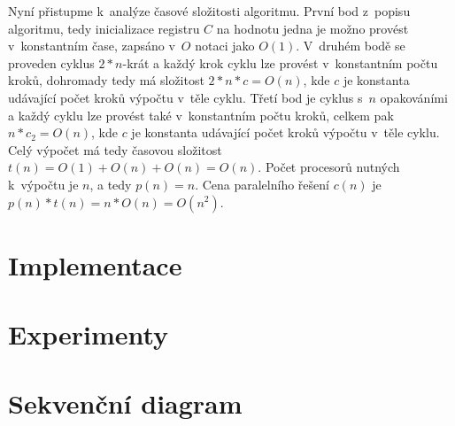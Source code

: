 \documentclass[a4paper, 12pt]{article}
\begin{document}
Nyní přistupme k~analýze časové složitosti algoritmu.
První bod z~popisu algoritmu, tedy inicializace registru $C$ na hodnotu jedna je možno provést v~konstantním čase,
zapsáno v~$O$ notaci jako $O(1)$.
V~druhém bodě se proveden cyklus $2*n$-krát a každý krok cyklu lze provést v~konstantním počtu kroků, dohromady tedy
má složitost $2*n*c=O(n)$, kde $c$ je konstanta udávající počet kroků výpočtu v~těle cyklu.
Třetí bod je cyklus s~$n$ opakováními a každý cyklu lze provést také v~konstantním počtu kroků, celkem pak $n*c_2=O(n)$,
kde $c$ je konstanta udávající počet kroků výpočtu v~těle cyklu.
Celý výpočet má tedy časovou složitost $t(n)=O(1)+O(n)+O(n)=O(n)$.
Počet procesorů nutných k~výpočtu je $n$, a tedy $p(n)=n$.
Cena paralelního řešení $c(n)$ je $p(n)*t(n)=n*O(n)=O(n^2)$.


\section{Implementace}
\label{sec:impl}


\section{Experimenty}
\label{sec:exprmts}

\section{Sekvenční diagram}
\label{sec:seq}

\newpage


\end{document}

